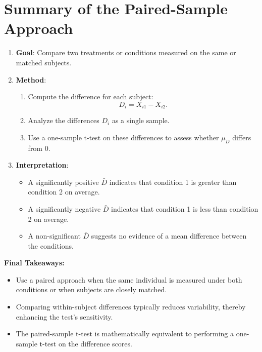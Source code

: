 \documentclass[10pt]{extarticle}
\begin{document}
\section{Summary of the Paired-Sample Approach}
\begin{enumerate}
    \item \textbf{Goal}: Compare two treatments or conditions measured on the same or matched subjects.
    \item \textbf{Method}:
    \begin{enumerate}
        \item Compute the difference for each subject:
        \[
        D_i = X_{i1} - X_{i2}.
        \]
        \item Analyze the differences $D_i$ as a single sample.
        \item Use a one-sample t-test on these differences to assess whether $\mu_D$ differs from 0.
    \end{enumerate}
    \item \textbf{Interpretation}:
    \begin{itemize}
        \item A significantly positive $\bar{D}$ indicates that condition 1 is greater than condition 2 on average.
        \item A significantly negative $\bar{D}$ indicates that condition 1 is less than condition 2 on average.
        \item A non-significant $\bar{D}$ suggests no evidence of a mean difference between the conditions.
    \end{itemize}
\end{enumerate}

\bigskip

\textbf{Final Takeaways:}
\begin{itemize}
    \item Use a paired approach when the same individual is measured under both conditions or when subjects are closely matched.
    \item Comparing within-subject differences typically reduces variability, thereby enhancing the test’s sensitivity.
    \item The paired-sample t-test is mathematically equivalent to performing a one-sample t-test on the difference scores.
\end{itemize}
\end{document}
